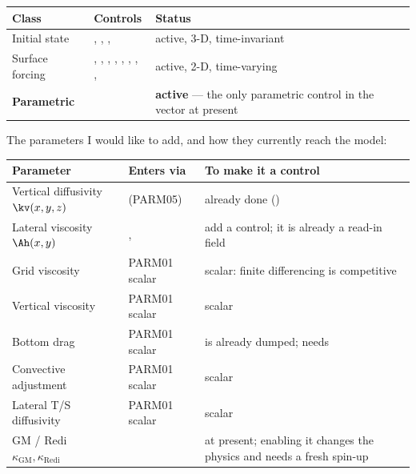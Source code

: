 \begin{center}
\begin{tabularx}{\textwidth}{@{}Y{0.55}Y{1.25}Y{1.2}@{}}
\toprule
\textbf{Class} & \textbf{Controls} & \textbf{Status}\\
\midrule
Initial state & , , ,
   & active, 3-D, time-invariant\\
Surface forcing & , , ,
  , , , ,
  ,  & active, 2-D, time-varying\\
\textbf{Parametric} &  & \textbf{active} --- the only
  parametric control in the vector at present\\
\bottomrule
\end{tabularx}
\end{center}

The parameters I would like to add, and how they currently reach the model:

\begin{center}
\begin{tabularx}{\textwidth}{@{}Y{0.7}Y{0.75}Y{1.55}@{}}
\toprule
\textbf{Parameter} & \textbf{Enters via} & \textbf{To make it a control}\\
\midrule
Vertical diffusivity $\kv(x,y,z)$ &  (PARM05)
  & already done ()\\
Lateral viscosity $\Ah(x,y)$ & , 
  & add a  control; it is already a read-in field\\
Grid viscosity  & PARM01 scalar & scalar: finite differencing is
  competitive\\
Vertical viscosity  & PARM01 scalar & scalar\\
Bottom drag  & PARM01 scalar
  &  is already dumped; needs \\
Convective adjustment  & PARM01 scalar & scalar\\
Lateral T/S diffusivity  & PARM01 scalar & scalar\\
GM / Redi $\kappa_{\mathrm{GM}},\kappa_{\mathrm{Redi}}$
  &  &  at present; enabling it
    changes the physics and needs a fresh spin-up\\
\bottomrule
\end{tabularx}
\end{center}

